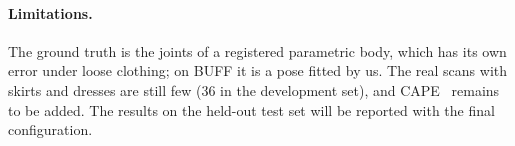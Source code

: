\documentclass[11pt]{article}
\begin{document}
\paragraph{Limitations.} The ground truth is the joints of a registered
parametric body, which has its own error under loose clothing; on BUFF it is
a pose fitted by us. The real scans with skirts and dresses are still few
(36 in the development set), and CAPE~\citep{ma2020cape} remains to be
added. The results on the held-out test set will be reported with the final
configuration.



\end{document}
